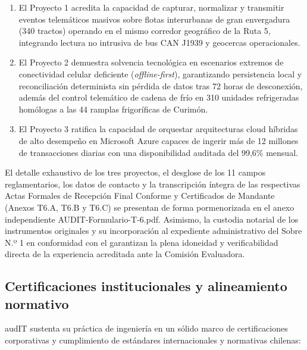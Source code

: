 \begin{enumerate}
  \item El Proyecto 1 acredita la capacidad de capturar, normalizar y transmitir eventos telemáticos masivos sobre flotas interurbanas de gran envergadura (340 tractos) operando en el mismo corredor geográfico de la Ruta 5, integrando lectura no intrusiva de bus CAN J1939 y geocercas operacionales.
  \item El Proyecto 2 demuestra solvencia tecnológica en escenarios extremos de conectividad celular deficiente (\textit{offline-first}), garantizando persistencia local y reconciliación determinista sin pérdida de datos tras 72 horas de desconexión, además del control telemático de cadena de frío en 310 unidades refrigeradas homólogas a las 44 ramplas frigoríficas de Curimón.
  \item El Proyecto 3 ratifica la capacidad de orquestar arquitecturas cloud híbridas de alto desempeño en Microsoft Azure capaces de ingerir más de 12 millones de transacciones diarias con una disponibilidad auditada del 99,6\% mensual.
\end{enumerate}

El detalle exhaustivo de los tres proyectos, el desglose de los 11 campos reglamentarios, los datos de contacto y la transcripción íntegra de las respectivas Actas Formales de Recepción Final Conforme y Certificados de Mandante (Anexos T6.A, T6.B y T6.C) se presentan de forma pormenorizada en el anexo independiente AUDIT-Formulario-T-6.pdf. Asimismo, la custodia notarial de los instrumentos originales y su incorporación al expediente administrativo del Sobre N.º 1 en conformidad con el  garantizan la plena idoneidad y verificabilidad directa de la experiencia acreditada ante la Comisión Evaluadora.

\subsection{Certificaciones institucionales y alineamiento normativo}\label{sec:1-certificaciones}

audIT sustenta su práctica de ingeniería en un sólido marco de certificaciones corporativas y cumplimiento de estándares internacionales y normativas chilenas:

